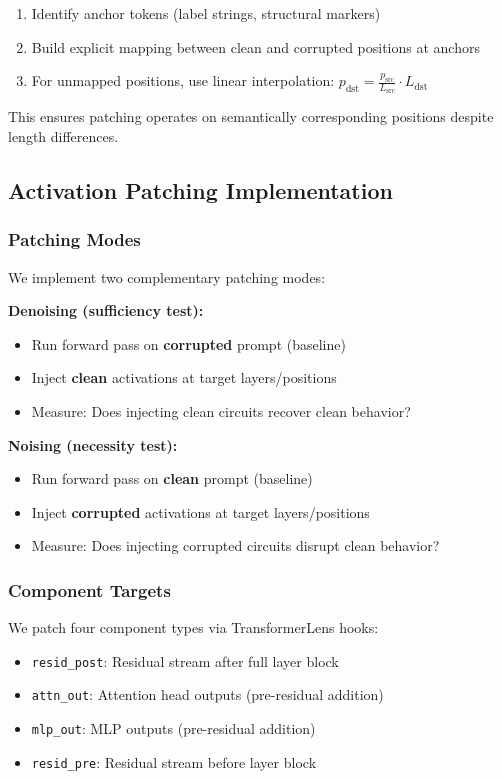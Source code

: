 \documentclass{article}
\begin{document}
\begin{enumerate}
    \item Identify anchor tokens (label strings, structural markers)
    \item Build explicit mapping between clean and corrupted positions at anchors
    \item For unmapped positions, use linear interpolation: $p_{\text{dst}} = \frac{p_{\text{src}}}{L_{\text{src}}} \cdot L_{\text{dst}}$
\end{enumerate}

This ensures patching operates on semantically corresponding positions despite length differences.

\subsection{Activation Patching Implementation}

\subsubsection{Patching Modes}

We implement two complementary patching modes:

\textbf{Denoising (sufficiency test):}
\begin{itemize}
    \item Run forward pass on \textbf{corrupted} prompt (baseline)
    \item Inject \textbf{clean} activations at target layers/positions
    \item Measure: Does injecting clean circuits recover clean behavior?
\end{itemize}

\textbf{Noising (necessity test):}
\begin{itemize}
    \item Run forward pass on \textbf{clean} prompt (baseline)
    \item Inject \textbf{corrupted} activations at target layers/positions
    \item Measure: Does injecting corrupted circuits disrupt clean behavior?
\end{itemize}

\subsubsection{Component Targets}

We patch four component types via TransformerLens hooks:
\begin{itemize}
    \item \texttt{resid\_post}: Residual stream after full layer block
    \item \texttt{attn\_out}: Attention head outputs (pre-residual addition)
    \item \texttt{mlp\_out}: MLP outputs (pre-residual addition)
    \item \texttt{resid\_pre}: Residual stream before layer block
\end{itemize}
\end{document}
